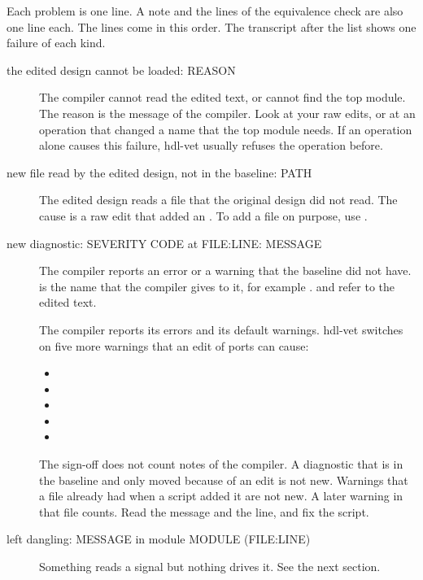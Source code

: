 Each problem is one line. A note and the lines of the equivalence check are also one
line each. The lines come in this order. The transcript after the list shows one failure
of each kind.

\begin{description}
\item[the edited design cannot be loaded: REASON] The compiler cannot read the
  edited text, or cannot find the top module. The reason is the message of the compiler.
  Look at your raw edits, or at an operation that changed a name that the top module
  needs. If an operation alone causes this failure, hdl-vet usually refuses the operation
  before.

\item[new file read by the edited design, not in the baseline: PATH] The edited
  design reads a file that the original design did not read. The cause is a raw edit that
  added an . To add a file on purpose, use .

\item[new diagnostic: SEVERITY CODE at FILE:LINE: MESSAGE] The compiler reports an
  error or a warning that the baseline did not have.  is the name that the
  compiler gives to it, for example .  and 
  refer to the edited text.

  The compiler reports its errors and its default warnings. hdl-vet switches on five
  more warnings that an edit of ports can cause:
  \begin{itemize}
  \item {}
  \item {}
  \item {}
  \item {}
  \item {}
  \end{itemize}

  The sign-off does not count notes of the compiler. A diagnostic that is in the
  baseline and only moved because of an edit is not new. Warnings that a file
  already had when a script added it are not new. A later warning in that file
  counts. Read the message and the line, and fix the script.

\item[left dangling: MESSAGE in module MODULE (FILE:LINE)] Something reads a signal but
  nothing drives it. See the next section.


\end{description}

